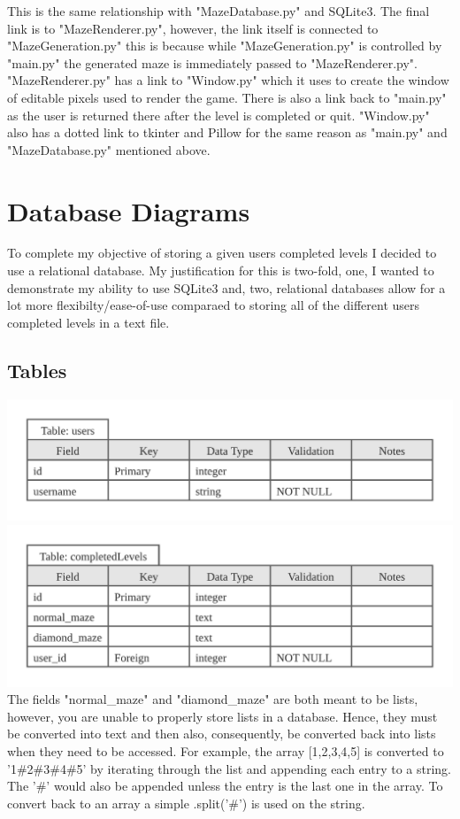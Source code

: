\documentclass{article}
\begin{document}
This is the same relationship with "MazeDatabase.py" and SQLite3. The final link is to "MazeRenderer.py", however, the link itself is connected to "MazeGeneration.py" this is because
while "MazeGeneration.py" is controlled by "main.py" the generated maze is immediately passed to "MazeRenderer.py".
"MazeRenderer.py" has a link to "Window.py" which it uses to create the window of editable pixels used to render the game. There is also a link back to "main.py" as the user
is returned there after the level is completed or quit. "Window.py" also has a dotted link to tkinter and Pillow for the same reason as "main.py" and "MazeDatabase.py" mentioned above.
\clearpage

\section{Database Diagrams}
To complete my objective of storing a given users completed levels I decided to use a relational database. My justification for this is two-fold, one, I wanted to demonstrate my ability
to use SQLite3 and, two, relational databases allow for a lot more flexibilty/ease-of-use comparaed to storing all of the different users completed levels in a text file.
\subsection{Tables}
\includegraphics[scale=1]{Users Table}
\linebreak
\includegraphics[scale=1]{completedLevels Table}
\linebreak
The fields "normal\_maze" and "diamond\_maze" are both meant to be lists,  however, you are unable to properly store lists in a database. Hence, they must be converted into
text and then also, consequently, be converted back into lists when they need to be accessed. For example, the array [1,2,3,4,5] is converted to '1\#2\#3\#4\#5' by
iterating through the list and appending each entry to a string. The '\#' would also be appended unless the entry is the last one in the array. To convert back to an array a simple
.split('\#') is used on the string.
\end{document}
